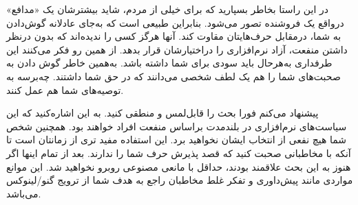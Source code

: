 در این راستا بخاطر بسپارید که برای خیلی از مردم، شاید بیشترشان
یک «مدافع» درواقع یک فروشنده تصور می‌شود. بنابراین طبیعی است
که به‌جای عادلانه گوش‌دادن به شما، درمقابل حرف‌هایتان مقاوت کند.
آنها هرگز کسی را ندیده‌اند که بدون درنظر داشتن منفعت، آزاد
نرم‌افزاری را دراختیارشان قرار بدهد. از همین رو فکر می‌کنند این طرفداری
به‌هرحال باید سودی برای شما داشته باشد. به‌همین خاطر گوش دادن به صحبت‌های
شما را هم یک لطف شخصی می‌دانند که در حق شما داشتند. چه‌برسه به توصیه‌های
شما هم عمل کنند.

پیشنهاد می‌کنم فورا بحث را قابل‌لمس و منطقی کنید. به این اشاره‌کنید
که این سیاست‌های نرم‌افزاری در بلندمدت براساس منفعت افراد خواهند بود.
همچنین شخص شما هیچ نفعی از انتخاب ایشان نخواهید برد. این استفاده
مفید تری از زمانتان است تا آنکه با مخاطبانی صحبت کنید که قصد پذیرش
حرف شما را ندارند. بعد از تمام اینها اگر هنوز به این بحث علاقمند بودند،
حداقل با مانعی مصنوعی روبرو نخواهید شد. این موانع مواردی مانند پیش‌داوری
و تفکر غلط مخاطبان راجع به هدف شما از ترویج گنو/لینوکس می‌باشد.

